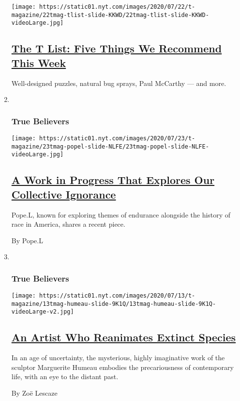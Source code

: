 \begin{enumerate}
  \texttt{[image: https://static01.nyt.com/images/2020/07/22/t-magazine/22tmag-tlist-slide-KKWD/22tmag-tlist-slide-KKWD-videoLarge.jpg]}

  \hypertarget{the-t-list-five-things-we-recommend-this-week}{%
  \subsection{\texorpdfstring{\href{/2020/07/23/t-magazine/puzzles-bug-spray-tlist.html}{The
  T List: Five Things We Recommend This
  Week}}{The T List: Five Things We Recommend This Week}}\label{the-t-list-five-things-we-recommend-this-week}}

  Well-designed puzzles, natural bug sprays, Paul McCarthy --- and more.
\item ~
  \hypertarget{true-believers-5}{%
  \subsubsection{True Believers}\label{true-believers-5}}

  \texttt{[image: https://static01.nyt.com/images/2020/07/23/t-magazine/23tmag-popel-slide-NLFE/23tmag-popel-slide-NLFE-videoLarge.jpg]}

  \hypertarget{a-work-in-progress-that-explores-our-collective-ignorance}{%
  \subsection{\texorpdfstring{\href{/2020/07/23/t-magazine/pope-l-i-machine.html}{A
  Work in Progress That Explores Our Collective
  Ignorance}}{A Work in Progress That Explores Our Collective Ignorance}}\label{a-work-in-progress-that-explores-our-collective-ignorance}}

  Pope.L, known for exploring themes of endurance alongside the history
  of race in America, shares a recent piece.

  By Pope.L
\item ~
  \hypertarget{true-believers-6}{%
  \subsubsection{True Believers}\label{true-believers-6}}

  \texttt{[image: https://static01.nyt.com/images/2020/07/13/t-magazine/13tmag-humeau-slide-9K1Q/13tmag-humeau-slide-9K1Q-videoLarge-v2.jpg]}

  \hypertarget{an-artist-who-reanimates-extinct-species}{%
  \subsection{\texorpdfstring{\href{/2020/07/23/t-magazine/marguerite-humeau.html}{An
  Artist Who Reanimates Extinct
  Species}}{An Artist Who Reanimates Extinct Species}}\label{an-artist-who-reanimates-extinct-species}}

  In an age of uncertainty, the mysterious, highly imaginative work of
  the sculptor Marguerite Humeau embodies the precariousness of
  contemporary life, with an eye to the distant past.

  By Zoë Lescaze
\end{enumerate}

